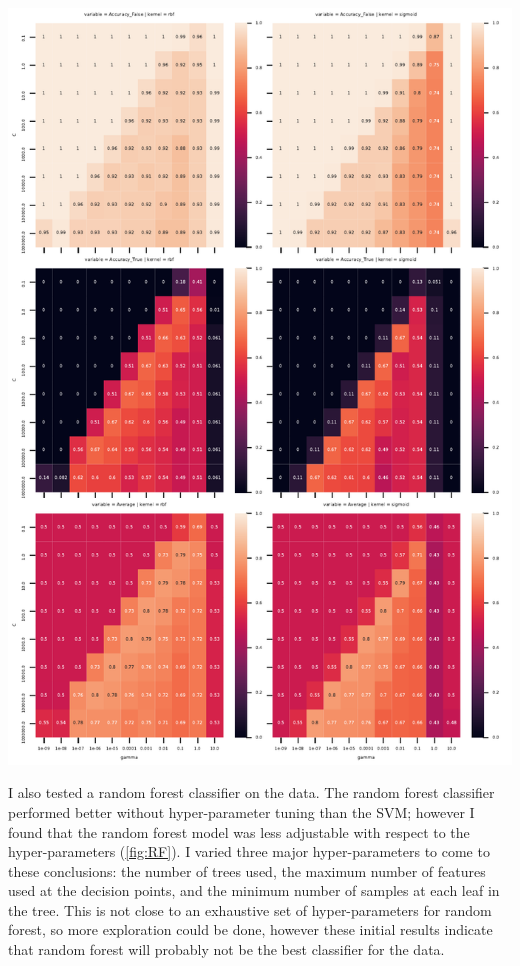 \documentclass{article}
\begin{document}
\begin{center}
    \includegraphics[width=.8\textwidth]{FinalProject/SVM_heat.pdf}
    \label{fig:SVM}
\end{center}

I also tested a random forest classifier on the data. The random forest classifier performed better without hyper-parameter tuning than the SVM; however I found that the random forest model was less adjustable with respect to the hyper-parameters (\autoref{fig:RF}). I varied three major hyper-parameters to come to these conclusions: the number of trees used, the maximum number of features used at the decision points, and the minimum number of samples at each leaf in the tree. This is not close to an exhaustive set of hyper-parameters for random forest, so more exploration could be done, however these initial results indicate that random forest will probably not be the best classifier for the data. 
\end{document}
